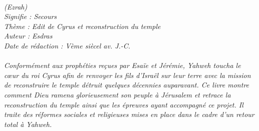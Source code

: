 \BFont
\noindent\hrulefill
\textit{
\bigskip
{\centering{}
\\(Ezrah)
\\Signifie : Secours
\\Thème : Edit de Cyrus et reconstruction du temple 
\\Auteur : Esdras
\\Date de rédaction : Vème siècel av. J.-C.\\}
}
\textit{
\\Conformément aux prophéties reçues par Esaïe et Jérémie, Yahweh toucha le cœur du roi Cyrus afin de renvoyer les fils d’Israël sur leur terre avec la mission de reconstruire le temple détruit quelques décennies auparavant. Ce livre montre comment Dieu ramena glorieusement son peuple à Jérusalem et retrace la reconstruction du temple ainsi que les épreuves ayant accompagné ce projet. Il traite des réformes sociales et religieuses mises en place dans le cadre d’un retour total à Yahweh.\bigskip
}
\par\nobreak\noindent\hrulefill
